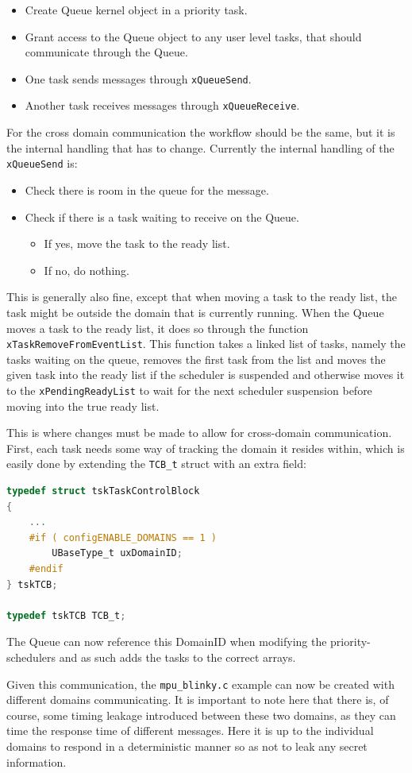 \begin{itemize}
  \item Create Queue kernel object in a priority task.
  \item Grant access to the Queue object to any user level tasks, that should communicate through the Queue.
  \item One task sends messages through \texttt{xQueueSend}.
  \item Another task receives messages through \texttt{xQueueReceive}.
\end{itemize}

For the cross domain communication the workflow should be the same, but it is
the internal handling that has to change. Currently the internal handling of
the \texttt{xQueueSend} is:
\begin{itemize}
  \item Check there is room in the queue for the message.
  \item Check if there is a task waiting to receive on the Queue.
    \begin{itemize}
      \item If yes, move the task to the ready list.
      \item If no, do nothing.
    \end{itemize}
\end{itemize}

This is generally also fine, except that when moving a task to the ready list,
the task might be outside the domain that is currently running. When the Queue
moves a task to the ready list, it does so through the function
\texttt{xTaskRemoveFromEventList}. This function takes a linked list of tasks,
namely the tasks waiting on the queue, removes the first task from the list
and moves the given task into the ready list if the scheduler is suspended and
otherwise moves it to the \texttt{xPendingReadyList} to wait for the next
scheduler suspension before moving into the true ready list. 

This is where changes must be made to allow for cross-domain communication.
First, each task needs some way of tracking the domain it resides within, which
is easily done by extending the \texttt{TCB\_t} struct with an extra field:
\begin{lstlisting}[language={c}]
typedef struct tskTaskControlBlock
{
    ...
    #if ( configENABLE_DOMAINS == 1 )
        UBaseType_t uxDomainID;
    #endif
} tskTCB;

typedef tskTCB TCB_t;
\end{lstlisting}

The Queue can now reference this DomainID when modifying the
priority-schedulers and as such adds the tasks to the correct arrays.

Given this communication, the \texttt{mpu\_blinky.c} example can now be created
with different domains communicating. It is important to note here that there
is, of course, some timing leakage introduced between these two domains, as they
can time the response time of different messages. Here it is up to the
individual domains to respond in a deterministic manner so as not to leak any
secret information.



